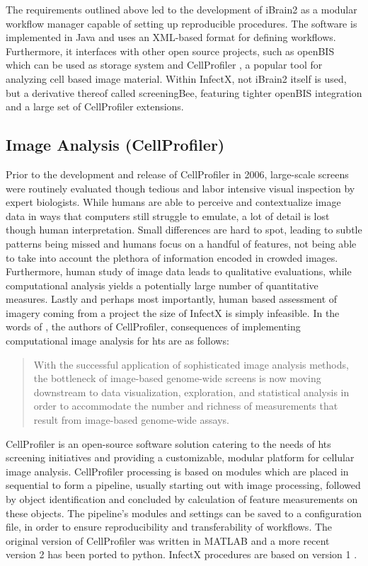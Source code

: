 The requirements outlined above led to the development of iBrain2 as a modular workflow manager capable of setting up reproducible procedures. The software is implemented in Java and uses an XML-based format for defining workflows. Furthermore, it interfaces with other open source projects, such as openBIS \citep{Bauch2011} which can be used as storage system and CellProfiler \citep{Carpenter2006,Kamentsky2011}, a popular tool for analyzing cell based image material. Within InfectX, not iBrain2 itself is used, but a derivative thereof called screeningBee, featuring tighter openBIS integration and a large set of CellProfiler extensions.

\subsection{Image Analysis (CellProfiler)}
Prior to the development and release of CellProfiler in 2006, large-scale screens were routinely evaluated though tedious and labor intensive visual inspection by expert biologists. While humans are able to perceive and contextualize image data in ways that computers still struggle to emulate, a lot of detail is lost though human interpretation. Small differences are hard to spot, leading to subtle patterns being missed and humans focus on a handful of features, not being able to take into account the plethora of information encoded in crowded images. Furthermore, human study of image data leads to qualitative evaluations, while computational analysis yields a potentially large number of quantitative measures. Lastly and perhaps most importantly, human based assessment of imagery coming from a project the size of InfectX is simply infeasible. In the words of \citeauthor{Carpenter2006}, the authors of CellProfiler, consequences of implementing computational image analysis for \gls{hts} are as follows:

\begin{quote}
With the successful application of sophisticated image analysis methods, the bottleneck of image-based genome-wide screens is now moving downstream to data visualization, exploration, and statistical analysis in order to accommodate the number and richness of measurements that result from image-based genome-wide assays.
\end{quote}

CellProfiler is an open-source software solution catering to the needs of \gls{hts} screening initiatives and providing a customizable, modular platform for cellular image analysis. CellProfiler processing is based on modules which are placed in sequential to form a pipeline, usually starting out with image processing, followed by object identification and concluded by calculation of feature measurements on these objects. The pipeline's modules and settings can be saved to a configuration file, in order to ensure reproducibility and transferability of workflows. The original version of CellProfiler was written in MATLAB and a more recent version 2 has been ported to python. InfectX procedures are based on version 1 \citep{Carpenter2006}.

